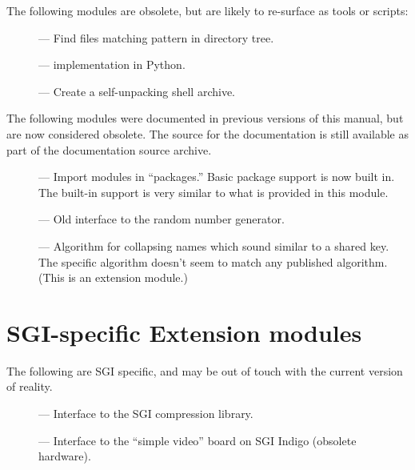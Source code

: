 

The following modules are obsolete, but are likely to re-surface as
tools or scripts:

\begin{description}
\item[]
--- Find files matching pattern in directory tree.

\item[]
---  implementation in Python.

\item[]
--- Create a self-unpacking \UNIX{} shell archive.
\end{description}


The following modules were documented in previous versions of this
manual, but are now considered obsolete.  The source for the
documentation is still available as part of the documentation source
archive.

\begin{description}
\item[]
--- Import modules in ``packages.''  Basic package support is now
built in.  The built-in support is very similar to what is provided in
this module.

\item[]
--- Old interface to the random number generator.

\item[]
--- Algorithm for collapsing names which sound similar to a shared
key.  The specific algorithm doesn't seem to match any published
algorithm.  (This is an extension module.)
\end{description}


\section{SGI-specific Extension modules}

The following are SGI specific, and may be out of touch with the
current version of reality.

\begin{description}
\item[]
--- Interface to the SGI compression library.

\item[]
--- Interface to the ``simple video'' board on SGI Indigo
(obsolete hardware).
\end{description}
